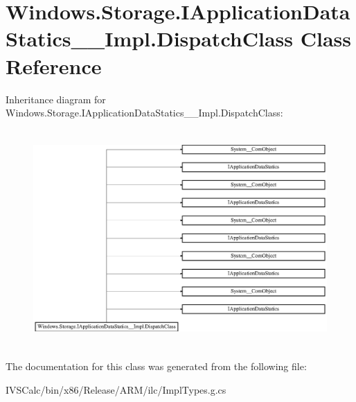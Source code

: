 \hypertarget{class_windows_1_1_storage_1_1_i_application_data_statics_____impl_1_1_dispatch_class}{}\section{Windows.\+Storage.\+I\+Application\+Data\+Statics\+\_\+\+\_\+\+Impl.\+Dispatch\+Class Class Reference}
\label{class_windows_1_1_storage_1_1_i_application_data_statics_____impl_1_1_dispatch_class}
Inheritance diagram for Windows.\+Storage.\+I\+Application\+Data\+Statics\+\_\+\+\_\+\+Impl.\+Dispatch\+Class\+:\begin{figure}[H]
\begin{center}
\leavevmode
\includegraphics[height=8.301887cm]{class_windows_1_1_storage_1_1_i_application_data_statics_____impl_1_1_dispatch_class}
\end{center}
\end{figure}


The documentation for this class was generated from the following file\+:\begin{DoxyCompactItemize}
\item 
I\+V\+S\+Calc/bin/x86/\+Release/\+A\+R\+M/ilc/Impl\+Types.\+g.\+cs\end{DoxyCompactItemize}
